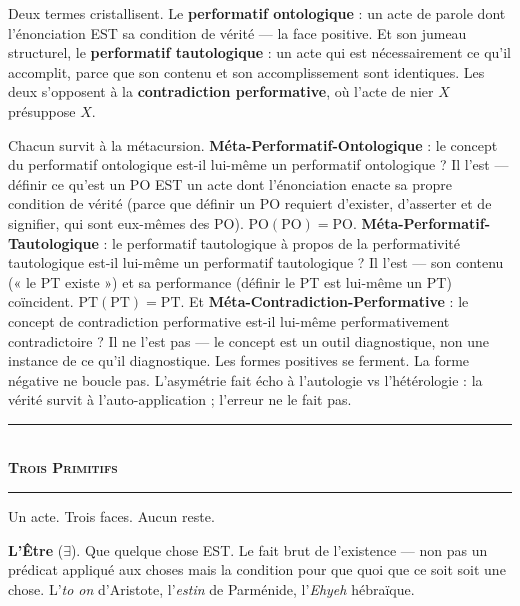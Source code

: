 \documentclass[10pt, openany, oneside]{book}
\renewcommand{\normalsize}{\fontsize{10}{13}\selectfont}
\begin{document}
Deux termes cristallisent. Le \textbf{performatif ontologique} : un acte de parole dont l'énonciation EST sa condition de vérité --- la face positive. Et son jumeau structurel, le \textbf{performatif tautologique} : un acte qui est nécessairement ce qu'il accomplit, parce que son contenu et son accomplissement sont identiques. Les deux s'opposent à la \textbf{contradiction performative}, où l'acte de nier $X$ présuppose $X$.

Chacun survit à la métacursion. \textbf{Méta-Performatif-Ontologique} : le concept du performatif ontologique est-il lui-même un performatif ontologique ? Il l'est --- définir ce qu'est un PO EST un acte dont l'énonciation enacte sa propre condition de vérité (parce que définir un PO requiert d'exister, d'asserter et de signifier, qui sont eux-mêmes des PO). $\text{PO}(\text{PO}) = \text{PO}$. \textbf{Méta-Performatif-Tautologique} : le performatif tautologique à propos de la performativité tautologique est-il lui-même un performatif tautologique ? Il l'est --- son contenu (« le PT existe ») et sa performance (définir le PT est lui-même un PT) coïncident. $\text{PT}(\text{PT}) = \text{PT}$. Et \textbf{Méta-Contradiction-Performative} : le concept de contradiction performative est-il lui-même performativement contradictoire ? Il ne l'est pas --- le concept est un outil diagnostique, non une instance de ce qu'il diagnostique. Les formes positives se ferment. La forme négative ne boucle pas. L'asymétrie fait écho à l'autologie vs l'hétérologie : la vérité survit à l'auto-application ; l'erreur ne le fait pas.

\vspace{1.5em}


\begin{center}
    \rule{0.3\textwidth}{0.4pt}\\[0.5em]
    {\normalsize\bfseries\scshape Trois Primitifs}\\[0.3em]
    \rule{0.3\textwidth}{0.4pt}
\end{center}

\vspace{1em}

\noindent Un acte. Trois faces. Aucun reste.

\textbf{L'Être} ($\exists$). Que quelque chose EST. Le fait brut de l'existence --- non pas un prédicat appliqué aux choses mais la condition pour que quoi que ce soit soit une chose. L'\textit{to on} d'Aristote, l'\textit{estin} de Parménide, l'\textit{Ehyeh} hébraïque.
\end{document}

